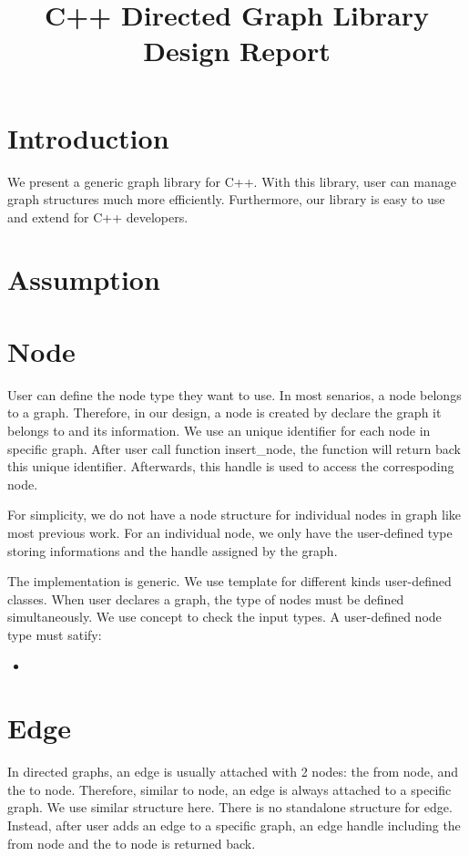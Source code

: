 \documentclass[]{article}
\title{C++ Directed Graph Library Design Report}
\author{}
\begin{document}
\maketitle

\tableofcontents
\newpage
\section{Introduction}
We present a generic graph library for C++. With this library, user can manage graph structures much more efficiently. Furthermore, our library is easy to use and extend for C++ developers.
\section{Assumption}

\section {Node}
User can define the node type they want to use. In most senarios, a node belongs to a graph. Therefore, in our design, a node is created by declare the graph it belongs to and its information. We use an unique identifier for each node in specific graph. After user call function insert\_node, the function will return back this unique identifier. Afterwards, this handle is used to access the correspoding node.

For simplicity, we do not have a node structure for individual nodes in graph like most previous work. For an individual node, we only have the user-defined type storing informations and the handle assigned by the graph.

The implementation is generic. We use template for different kinds user-defined classes. When user declares a graph, the type of nodes must be defined simultaneously. We use concept to check the input types. A user-defined node type must satify:
\begin{itemize}
	\item
	\end{itemize}

\section {Edge}
In directed graphs, an edge is usually attached with 2 nodes: the from node, and the to node. Therefore, similar to node, an edge is always attached to a specific graph. We use similar structure here. There is no standalone structure for edge. Instead, after user adds an edge to a specific graph, an edge handle including the from node and the to node is returned back.
\end{document}

